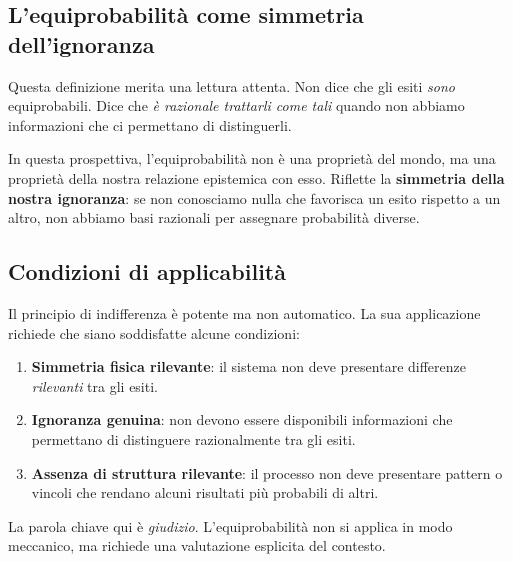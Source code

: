 \documentclass[
  italian,
  letterpaper,
  a4paper,
  11pt,
  open=any]{scrbook}
\providecommand{\tightlist}{%
  \setlength{\itemsep}{0pt}\setlength{\parskip}{0pt}}
\theoremstyle{plain}
\theoremstyle{definition}
\theoremstyle{definition}
\theoremstyle{remark}
\begin{document}
\subsection{L'equiprobabilità come simmetria
dell'ignoranza}\label{lequiprobabilituxe0-come-simmetria-dellignoranza}

Questa definizione merita una lettura attenta. Non dice che gli esiti
\emph{sono} equiprobabili. Dice che \emph{è razionale trattarli come
tali} quando non abbiamo informazioni che ci permettano di distinguerli.

In questa prospettiva, l'equiprobabilità non è una proprietà del mondo,
ma una proprietà della nostra relazione epistemica con esso. Riflette la
\textbf{simmetria della nostra ignoranza}: se non conosciamo nulla che
favorisca un esito rispetto a un altro, non abbiamo basi razionali per
assegnare probabilità diverse.

\subsection{Condizioni di
applicabilità}\label{condizioni-di-applicabilituxe0}

Il principio di indifferenza è potente ma non automatico. La sua
applicazione richiede che siano soddisfatte alcune condizioni:

\begin{enumerate}
\def\labelenumi{\arabic{enumi}.}
\tightlist
\item
  \textbf{Simmetria fisica rilevante}: il sistema non deve presentare
  differenze \emph{rilevanti} tra gli esiti.
\item
  \textbf{Ignoranza genuina}: non devono essere disponibili informazioni
  che permettano di distinguere razionalmente tra gli esiti.
\item
  \textbf{Assenza di struttura rilevante}: il processo non deve
  presentare pattern o vincoli che rendano alcuni risultati più
  probabili di altri.
\end{enumerate}

La parola chiave qui è \emph{giudizio}. L'equiprobabilità non si applica
in modo meccanico, ma richiede una valutazione esplicita del contesto.
\end{document}
